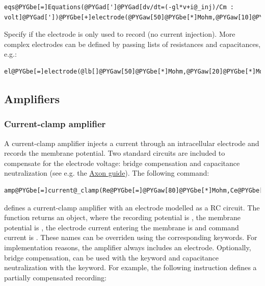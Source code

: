 \documentclass[letterpaper,10pt,english]{manual}
\begin{document}
\begin{Verbatim}[commandchars=@\[\]]
eqs@PYGbe[=]Equations(@PYGad[']@PYGad[dv/dt=(-gl*v+i@_inj)/Cm : volt]@PYGad['])@PYGbe[+]electrode(@PYGaw[50]@PYGbe[*]Mohm,@PYGaw[10]@PYGbe[*]pF,vm@PYGbe[=]@PYGad[']@PYGad[v]@PYGad['],i@_cmd@PYGbe[=]@PYGbe[.]@PYGaw[5]@PYGbe[*]nA)
\end{Verbatim}

Specify  if the electrode is only used to record (no current injection). More complex
electrodes can be defined by passing lists of resistances and capacitances, e.g.:

\begin{Verbatim}[commandchars=@\[\]]
el@PYGbe[=]electrode(@lb[]@PYGaw[50]@PYGbe[*]Mohm,@PYGaw[20]@PYGbe[*]Mohm@rb[],@lb[]@PYGaw[5]@PYGbe[*]pF,@PYGaw[3]@PYGbe[*]pF@rb[])
\end{Verbatim}


\subsection{Amplifiers}


\subsubsection{Current-clamp amplifier}

A current-clamp amplifier injects a current through an intracellular electrode
and records the membrane potential. Two standard circuits are included to compensate
for the electrode voltage: bridge compensation and capacitance neutralization
(see e.g. the \href{http://www.moleculardevices.com/pages/instruments/axon\_guide.html}{Axon guide}).
The following command:

\begin{Verbatim}[commandchars=@\[\]]
amp@PYGbe[=]current@_clamp(Re@PYGbe[=]@PYGaw[80]@PYGbe[*]Mohm,Ce@PYGbe[=]@PYGaw[10]@PYGbe[*]pF)
\end{Verbatim}

defines a current-clamp amplifier with an electrode modelled as a RC circuit. The function
returns an \hyperlink{brian.Equations}{} object, where
the recording potential is , the membrane potential is , the electrode current
entering the membrane is  and command current is .
These names can be overriden using the corresponding keywords.
For implementation reasons, the amplifier always includes an electrode.
Optionally, bridge compensation, can be used with the  keyword and capacitance
neutralization with the  keyword. For example, the following instruction defines
a partially compensated recording:
\end{document}
